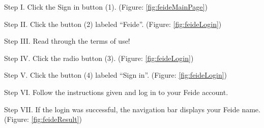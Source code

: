 \begin{userManualItemlist}
	\item[Step I.] Click the Sign in button (1). (Figure: \ref{fig:feideMainPage})
	\item[Step II.] Click the button (2) labeled “Feide”. (Figure: \ref{fig:feideLogin})
	\item[Step III.] Read through the terms of use!  
	\item[Step IV.] Click the radio button (3). (Figure: \ref{fig:feideLogin})
	\item[Step V.] Click the button (4) labeled “Sign in”. (Figure: \ref{fig:feideLogin}) 
	\item[Step VI.] Follow the instructions given and log in to your Feide account.
	\item[Step VII.] If the login was successful, the navigation bar displays your Feide name. (Figure: \ref{fig:feideResult})
\end{userManualItemlist}
